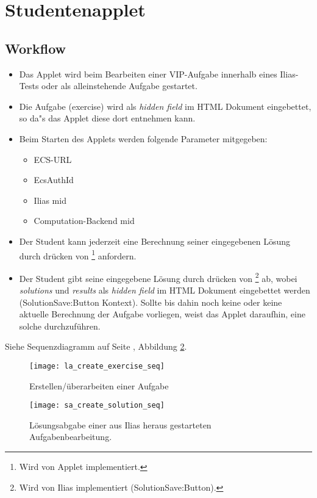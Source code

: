 \documentclass[12pt,a4paper]{article}
\newcommand{\button}[1]{\fbox{\texttt{#1}}}
\begin{document}
\section{Studentenapplet}
\subsection{Workflow}
\begin{itemize}
  \item Das Applet wird beim Bearbeiten einer VIP-Aufgabe innerhalb eines Ilias-Tests
    oder als alleinstehende Aufgabe gestartet.
  \item Die Aufgabe (exercise) wird als \textit{hidden field} im HTML
    Dokument eingebettet, so da"s das Applet diese dort entnehmen kann.
  \item Beim Starten des Applets werden folgende Parameter mitgegeben:
    \begin{itemize}
      \item ECS-URL
      \item EcsAuthId
      \item Ilias mid
      \item Computation-Backend mid
    \end{itemize}
  \item Der Student kann jederzeit eine Berechnung seiner eingegebenen Lösung
    durch drücken von \button{berechnen}\footnote{Wird von Applet
    implementiert.} anfordern.
  \item Der Student gibt seine eingegebene Lösung durch drücken von
    \button{weiter}\footnote{Wird von Ilias implementiert
    (SolutionSave:Button).} ab, wobei \textit{solutions} und \textit{results}
    als \textit{hidden field} im HTML Dokument eingebettet werden
    (SolutionSave:Button Kontext). Sollte bis dahin noch keine oder keine
    aktuelle Berechnung der Aufgabe vorliegen, weist das Applet daraufhin, eine
    solche durchzuführen.
\end{itemize}
Siehe Sequenzdiagramm auf Seite \pageref{seq:sa_create_solution_seq}, Abbildung \ref{seq:sa_create_solution_seq}.

\begin{figure}[p]
  \texttt{[image: la\_create\_exercise\_seq]}
  \caption{\label{seq:la_create_exercise}Erstellen/überarbeiten einer Aufgabe}
\end{figure}

\begin{figure}[p]
  \texttt{[image: sa\_create\_solution\_seq]}
  \caption{\label{seq:sa_create_solution_seq}Lösungsabgabe einer aus Ilias
  heraus gestarteten Aufgabenbearbeitung.}
\end{figure}
\end{document}
